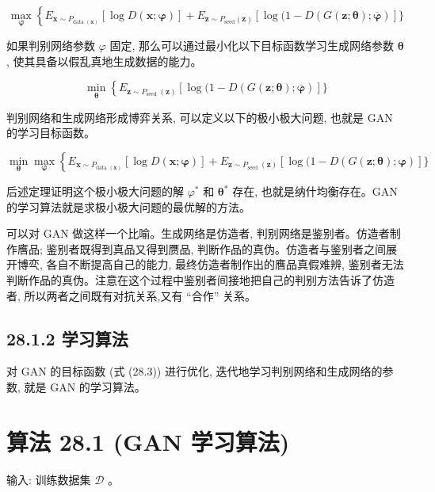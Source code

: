\documentclass[10pt]{article}
\begin{document}
\begin{equation*}
\max _{\boldsymbol{\varphi}}\left\{E_{\boldsymbol{x} \sim P_{\text {data }(\boldsymbol{x})}}[\log D(\boldsymbol{x} ; \boldsymbol{\varphi})]+E_{\boldsymbol{z} \sim P_{\mathrm{seed}}(\boldsymbol{z})}[\log (1-D(G(\boldsymbol{z} ; \boldsymbol{\theta}) ; \overline{\boldsymbol{\varphi}})]\}\right. \tag{28.1}
\end{equation*}


如果判别网络参数 $\varphi$ 固定, 那么可以通过最小化以下目标函数学习生成网络参数 $\boldsymbol{\theta}$, 使其具备以假乱真地生成数据的能力。


\begin{equation*}
\min _{\boldsymbol{\theta}}\left\{E_{\boldsymbol{z} \sim P_{\text {seed }}(\boldsymbol{z})}[\log (1-D(G(\boldsymbol{z} ; \boldsymbol{\theta}) ; \overline{\boldsymbol{\varphi}})]\}\right. \tag{28.2}
\end{equation*}


判别网络和生成网络形成博弈关系, 可以定义以下的极小极大问题, 也就是 GAN 的学习目标函数。


\begin{equation*}
\min _{\boldsymbol{\theta}} \max _{\boldsymbol{\varphi}}\left\{E_{\boldsymbol{x} \sim P_{\text {data }(\boldsymbol{x})}}[\log D(\boldsymbol{x} ; \boldsymbol{\varphi})]+E_{\boldsymbol{z} \sim P_{\text {seed }}(\boldsymbol{z})}[\log (1-D(G(\boldsymbol{z} ; \boldsymbol{\theta}) ; \boldsymbol{\varphi})]\}\right. \tag{28.3}
\end{equation*}


后述定理证明这个极小极大问题的解 $\varphi^{*}$ 和 $\boldsymbol{\theta}^{*}$ 存在, 也就是纳什均衡存在。GAN 的学习算法就是求极小极大问题的最优解的方法。

可以对 GAN 做这样一个比喻。生成网络是仿造者, 判别网络是鉴别者。仿造者制作噟品; 鉴别者既得到真品又得到赝品, 判断作品的真伪。仿造者与鉴别者之间展开博亪, 各自不断提高自己的能力, 最终仿造者制作出的噟品真假难辨, 鉴别者无法判断作品的真伪。注意在这个过程中鉴别者间接地把自己的判别方法告诉了仿造者, 所以两者之间既有对抗关系,又有 “合作” 关系。

\subsection*{28.1.2 学习算法}
对 GAN 的目标函数 (式 (28.3)) 进行优化, 迭代地学习判别网络和生成网络的参数, 就是 GAN 的学习算法。

\section*{算法 28.1 (GAN 学习算法)}
输入: 训练数据集 $\mathcal{D}$ 。
\end{document}

